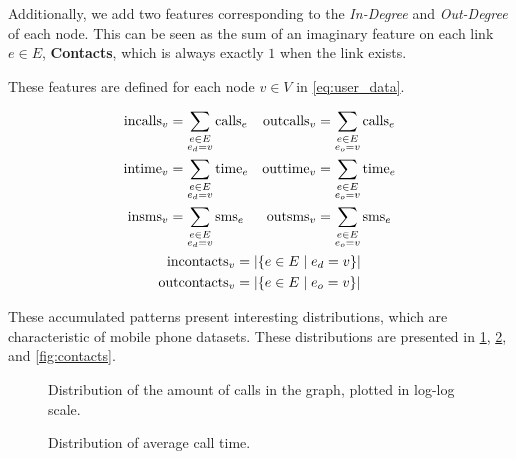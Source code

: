 Additionally, we add two features corresponding to the \emph{In-Degree} and \emph{Out-Degree} of each node. This can be seen as the sum of an imaginary feature on each link $e \in E$, \textbf{Contacts}, which is always exactly $1$ when the link exists.

These features are defined for each node $v \in V$ in \cref{eq:user_data}.

\begin{equation}
\begin{gathered}
\begin{aligned}
\operatorname{incalls}_v &= \sum_{\substack{e \in E \\ e_d = v}} \operatorname{calls}_e &
\operatorname{outcalls}_v &= \sum_{\substack{e \in E \\ e_o = v}} \operatorname{calls}_e \\
\operatorname{intime}_v &= \sum_{\substack{e \in E \\ e_d = v}} \operatorname{time}_e &
\operatorname{outtime}_v &= \sum_{\substack{e \in E \\ e_o = v}} \operatorname{time}_e \\
\operatorname{insms}_v &= \sum_{\substack{e \in E \\ e_d = v}} \operatorname{sms}_e &
\operatorname{outsms}_v &= \sum_{\substack{e \in E \\ e_o = v}} \operatorname{sms}_e \\
\end{aligned} \\
\begin{aligned}
\operatorname{incontacts}_v &= \left| \left\{ e \in E \mid e_d = v \right\} \right| \\
\operatorname{outcontacts}_v &= \left| \left\{ e \in E \mid e_o = v \right\} \right|
\end{aligned}
\end{gathered}
\label{eq:user_data}
\end{equation}

These accumulated patterns present interesting distributions,
which are characteristic of mobile phone datasets. These distributions are presented in \cref{fig:callsms}, \cref{fig:time}, and \cref{fig:contacts}.

\begin{figure}
\caption{Distribution of the amount of calls in the graph, plotted in log-log scale.}
\label{fig:callsms}
\end{figure}

\begin{figure}
\caption{Distribution of average call time.}
\label{fig:time}
\end{figure}

